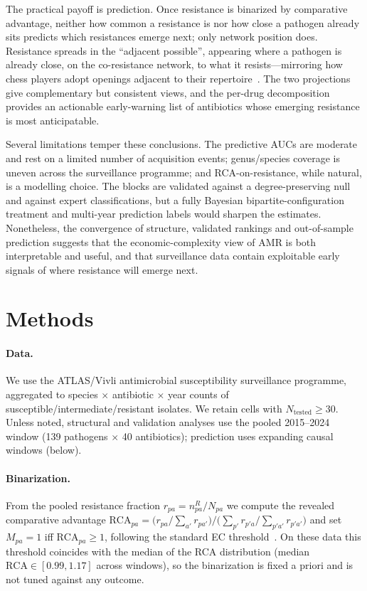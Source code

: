 \documentclass[11pt]{article}
\newcommand{\rca}{\mathrm{RCA}}
\begin{document}
The practical payoff is prediction. Once resistance is binarized by comparative advantage, neither how
common a resistance is nor how close a pathogen already sits predicts which resistances emerge next;
only network position does. Resistance spreads in the ``adjacent possible'', appearing where a pathogen
is already close, on the co-resistance network, to what it resists---mirroring how chess players adopt
openings adjacent to their repertoire~\cite{demarzo2023chess}. The two projections give complementary
but consistent views, and the per-drug decomposition provides an actionable early-warning list of
antibiotics whose emerging resistance is most anticipatable.

Several limitations temper these conclusions. The predictive AUCs are moderate and rest on a limited
number of acquisition events; genus/species coverage is uneven across the surveillance programme; and
RCA-on-resistance, while natural, is a modelling choice. The blocks are validated against a
degree-preserving null and against expert classifications, but a fully Bayesian bipartite-configuration
treatment and multi-year prediction labels would sharpen the estimates. Nonetheless, the convergence of
structure, validated rankings and out-of-sample prediction suggests that the economic-complexity view
of AMR is both interpretable and useful, and that surveillance data contain exploitable early signals
of where resistance will emerge next.

\section{Methods}

\paragraph{Data.} We use the ATLAS/Vivli antimicrobial susceptibility surveillance programme,
aggregated to species $\times$ antibiotic $\times$ year counts of susceptible/intermediate/resistant
isolates. We retain cells with $N_{\text{tested}}\ge 30$. Unless noted, structural and validation
analyses use the pooled 2015--2024 window (\num{139} pathogens $\times$ \num{40} antibiotics);
prediction uses expanding causal windows (below).

\paragraph{Binarization.} From the pooled resistance fraction $r_{pa}=n^R_{pa}/N_{pa}$ we compute the
revealed comparative advantage
$\rca_{pa} = \big(r_{pa}/\sum_{a'} r_{pa'}\big)\big/\big(\sum_{p'} r_{p'a}/\sum_{p'a'} r_{p'a'}\big)$
and set $M_{pa}=1$ iff $\rca_{pa}\ge 1$, following the standard EC threshold~\cite{laudati2023}. On
these data this threshold coincides with the median of the RCA distribution (median $\rca\in[0.99,1.17]$
across windows), so the binarization is fixed a priori and is not tuned against any outcome.
\end{document}
